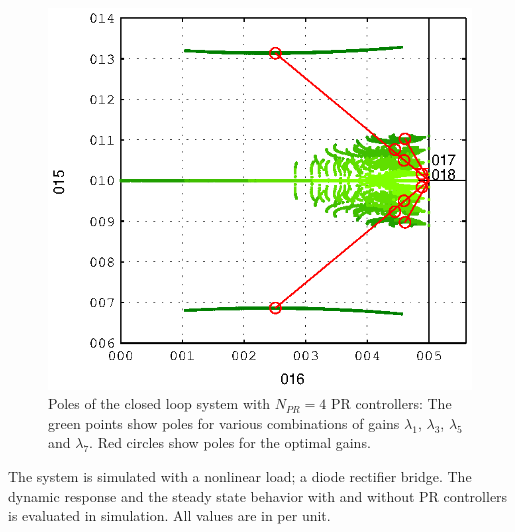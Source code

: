\documentclass[conference,10pt]{IEEEtran}
\begin{document}
\begin{figure}[!h]
\centering

\includegraphics{fig/root_locus_b}
%
\caption{Poles of the closed loop system with $N_{PR}=4$ PR controllers: The green points show poles for various combinations of gains $\lambda_1$, $\lambda_3$, $\lambda_5$ and $\lambda_7$. Red circles show poles for the optimal gains.}
\label{fig:PolesOptimalExample}
\end{figure}


The system is simulated with a nonlinear load; a diode rectifier bridge. The dynamic response and the steady state behavior with and without PR controllers is evaluated in simulation. All values are in per unit.
\end{document}
